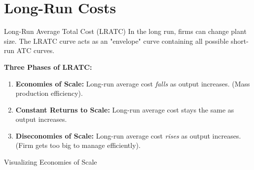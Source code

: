 \documentclass[aspectratio=169]{beamer}
\begin{document}
\section{Long-Run Costs}

\begin{frame}{Long-Run Average Total Cost (LRATC)}
    In the long run, firms can change plant size. The LRATC curve acts as an "envelope" curve containing all possible short-run ATC curves.
    
    \vspace{0.3cm}
    \textbf{Three Phases of LRATC:}
    \begin{enumerate}
        \item \textbf{Economies of Scale:} Long-run average cost \textit{falls} as output increases. (Mass production efficiency).
        \item \textbf{Constant Returns to Scale:} Long-run average cost stays the same as output increases.
        \item \textbf{Diseconomies of Scale:} Long-run average cost \textit{rises} as output increases. (Firm gets too big to manage efficiently).
    \end{enumerate}
\end{frame}

\begin{frame}{Visualizing Economies of Scale}
    \centering
\end{frame}
\end{document}
